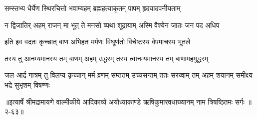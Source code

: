 \twolineshloka
{सम्स्तभ्य धैर्येण स्थिरचित्तो भवाम्यहम्}
{ब्रह्महत्याकृतम् पापम् हृदयादपनीयताम्} %

\twolineshloka
{न द्विजातिर् अहम् राजन् मा भूत् ते मनसो व्यथा}
{शूद्रायाम् अस्मि वैश्येन जातः जन पद अधिप} %

\twolineshloka
{इति इव वदतः कृच्च्रात् बाण अभिहत मर्मणः}
{विघूर्णतो विचेष्टस्य वेपमाचस्य भूतले} %

\twolineshloka
{तस्य तु आनम्यमानस्य तम् बाणम् अहम् उद्धरम्}
{तस्य त्वानम्यमानस्य तम् बाणामहमुद्धरम्} %

\fourlineindentedshloka
{जल आर्द्र गात्रम् तु विलप्य कृच्चान्}
{मर्म व्रणम् सम्ततम् उच्चसन्तम्}
{ततः सरय्वाम् तम् अहम् शयानम्}
{समीक्ष्य भद्रे सुभृशम् विषण्णः} %


॥इत्यार्षे श्रीमद्रामायणे वाल्मीकीये आदिकाव्ये अयोध्याकाण्डे ऋषिकुमारवधाख्यानम् नाम त्रिषष्ठितमः सर्गः ॥२-६३॥
